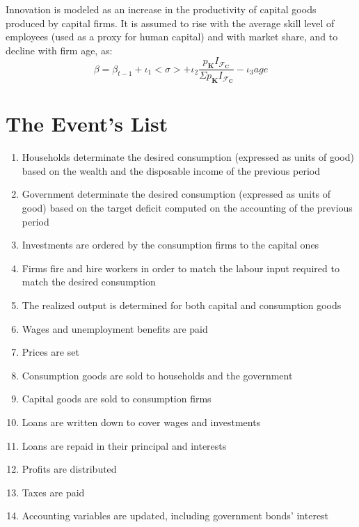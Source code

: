 \documentclass[]{article}
\begin{document}
Innovation is modeled as an increase in the productivity of capital goods produced by capital firms. It is assumed to rise with the average skill level of employees (used as a proxy for human capital) and with market share, and to decline with firm age, as:
$$\beta = \beta_{t-1} + \iota_1 <\sigma> + \iota_2 \frac{p_\mathbf{K}I_{\mathcal{F}_\mathbf{C}}}{\Sigma p_\mathbf{K}I_{\mathcal{F}_\mathbf{C}}} - \iota_3 age$$


\section{The Event's List}
\begin{enumerate}[label=\textbf{\Alph*}]
    \item Households determinate the desired consumption (expressed as units of good) based on the wealth and the disposable income of the previous period
    \item Government determinate the desired consumption (expressed as units of good) based on the target deficit computed on the accounting of the previous period
    \item Investments are ordered by the consumption firms to the capital ones
    \item Firms fire and hire workers in order to match the labour input required to match the desired consumption
    \item The realized output is determined for both capital and consumption goods
    \item Wages and unemployment benefits are paid
    \item Prices are set
    \item Consumption goods are sold to households and the government
    \item Capital goods are sold to consumption firms
    \item Loans are written down to cover wages and investments
    \item Loans are repaid in their principal and interests
    \item Profits are distributed
    \item Taxes are paid
    \item Accounting variables are updated, including government bonds' interest
\end{enumerate}
\end{document}
